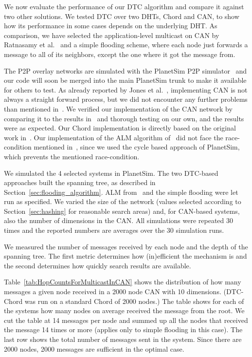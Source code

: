 \documentclass[fleqn,12pt,twoside]{article}
\begin{document}
We now evaluate the performance of our DTC algorithm and compare it
against two other solutions. We tested DTC over two DHTs, Chord and
CAN, to show how its performance in some cases depends on the
underlying DHT. As comparison, we have selected the application-level
multicast on CAN by Ratnasamy et al.~\cite{ratnasamy2001alm} and a
simple flooding scheme, where each node just forwards a message to all
of its neighbors, except the one where it got the message from.

The P2P overlay networks are simulated with the PlanetSim P2P
simulator~\cite{garcia2005pno} and our code will soon be merged into
the main PlanetSim trunk to make it available for others to test.  As
already reported by Jones et al.~\cite{jones2002uce}, implementing CAN
is not always a straight forward process, but we did not encounter any
further problems than mentioned in~\cite{jones2002uce}. We verified
our implementation of the CAN network by comparing it to the results
in~\cite{jones2002uce} and thorough testing on our own, and the
results were as expected. Our Chord implementation is directly based
on the original work in~\cite{StoicaI:Chord}. Our implementation of
the ALM algorithm of~\cite{ratnasamy2001alm} did not face the
race-condition mentioned in~\cite{Castro2003,jones2002uce}, since we
used the cycle based approach of PlanetSim, which prevents the
mentioned race-condition.

We simulated the 4 selected systems in PlanetSim. The two DTC-based
approaches built the spanning tree, as described in
Section~\ref{sec:flooding_algorithm}. ALM from~\cite{ratnasamy2001alm}
and the simple flooding were let run as specified. We varied the size
of the network (values selected according to Section~\ref{sec:hashing}
for reasonable search areas) and, for CAN-based systems, also the
number of dimensions in the CAN. All simulations were repeated 30
times and the reported numbers are averages over the 30 simulation
runs.

We measured the number of messages received by each node and the depth
of the spanning tree. The first metric determines how (in)efficient
the mechanism is and the second determines how quickly search results
are available.

Table~\ref{tab:HopCountsForMulticastInCAN} shows the distribution of
how many messages a given node received in a 2000 node CAN with 10
dimensions. (DTC-Chord was run on a standard Chord of 2000 nodes.) The
table shows for each of the systems how many nodes on average received
the message from the root. We cut the table at 14 messages per node and summed up all the
nodes that received the message 14 times or more (applies only to
simple flooding in this case). The last row shows the total number of
messages sent in the system. Since there are 2000 nodes, 2000 messages
are sufficient in the optimal case.
\end{document}
